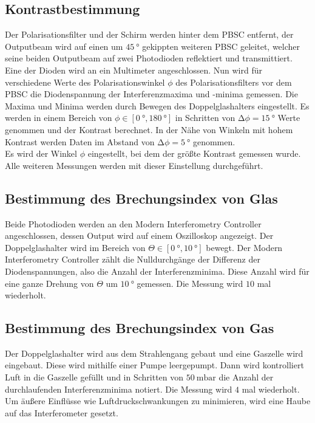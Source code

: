 \subsection{Kontrastbestimmung}
\label{subsec:Kontrastbestimmmung}

\noindent Der Polarisationsfilter und der Schirm werden hinter dem PBSC entfernt, der Outputbeam wird auf einen um $\SI{45}{\degree}$ gekippten weiteren PBSC geleitet, welcher seine beiden
Outputbeam auf zwei Photodioden reflektiert und transmittiert. Eine der Dioden wird an ein Multimeter angeschlossen. Nun wird für verschiedene Werte des Polarisationswinkel $\phi$ des 
Polarisationsfilters vor dem PBSC die Diodenspannung der Interferenzmaxima und -minima gemessen. Die Maxima und Minima werden durch Bewegen des Doppelglashalters eingestellt. Es werden 
in einem Bereich von $\phi \in \left[ \SI{0}{\degree}, \SI{180}{\degree}\right]$ in Schritten von $\increment \phi = \SI{15}{\degree}$ Werte genommen und der Kontrast berechnet. In der Nähe von Winkeln 
mit hohem Kontrast werden Daten im Abstand von $\increment\phi = \SI{5}{\degree}$ genommen.\\
Es wird der Winkel $\phi$ eingestellt, bei dem der größte Kontrast gemessen wurde. Alle weiteren Messungen werden mit dieser Einstellung durchgeführt.


\subsection{Bestimmung des Brechungsindex von Glas}
\label{subsec:n_glas_Durchführung}

\noindent Beide Photodioden werden an den Modern Interferometry Controller angeschlossen, dessen Output wird auf einem Oszilloskop angezeigt. Der Doppelglashalter wird im Bereich von 
$\Theta \in \left[ \SI{0}{\degree}, \SI{10}{\degree}\right]$ bewegt. Der Modern  Interferometry Controller zählt die Nulldurchgänge der Differenz der Diodenspannungen, also die Anzahl 
der Interferenzminima. Diese Anzahl wird für eine ganze Drehung von $\Theta$ um $\SI{10}{\degree}$ gemessen. Die Messung wird $\num{10}$ mal wiederholt.


\subsection{Bestimmung des Brechungsindex von Gas}
\label{subsec:Durchführung_n_Luft}

\noindent Der Doppelglashalter wird aus dem Strahlengang gebaut und eine Gaszelle wird eingebaut. Diese wird mithilfe einer Pumpe leergepumpt. Dann wird kontrolliert Luft in die Gaszelle 
gefüllt und in Schritten von $\SI{50}{\milli\bar}$ die Anzahl der durchlaufenden Interferenzminima notiert. Die Messung wird $\num{4}$ mal wiederholt. Um äußere Einflüsse wie 
Luftdruckschwankungen zu minimieren, wird eine Haube auf das Interferometer gesetzt. 